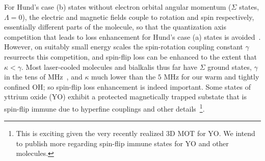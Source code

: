\documentclass[%
 reprint,
 amsmath,amssymb,
 aps,
prl,
]{revtex4-1}
\begin{document}

%

For Hund's case (b) states without electron orbital angular momentum ($\Sigma$ states, $\Lambda=0$), the electric and magnetic fields couple to rotation and spin respectively, essentially different parts of the molecule, so that the quantization axis competition that leads to loss enhancement for Hund's case (a) states is avoided~\cite{Bohn2013}. However, on suitably small energy scales the spin-rotation coupling constant $\gamma$ resurrects this competition, and spin-flip loss can be enhanced to the extent that $\kappa<\gamma$. Most laser-cooled molecules and bialkalis thus far have $\Sigma$ ground states, $\gamma$ in the tens of MHz~\cite{Quemener2016}, and $\kappa$ much lower than the $5\text{ MHz}$ for our warm and tightly confined OH; so spin-flip loss enhancement is indeed important. Some states of yttrium oxide (YO) exhibit a protected magnetically trapped substate that is spin-flip immune due to hyperfine couplings and other details~\footnote{This is exciting given the very recently realized 3D MOT for YO. We intend to publish more regarding spin-flip immune states for YO and other molecules.}. %


\end{document}
